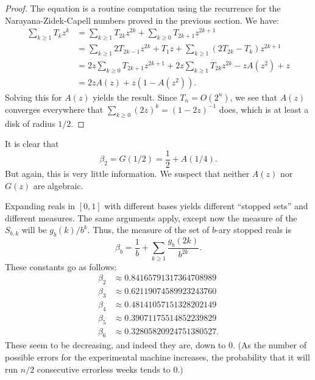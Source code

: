 \documentclass[12pt]{article}
\theoremstyle{definition}
\begin{document}
\begin{proof}
    The equation is a routine computation using the recurrence for the Narayana-Zidek-Capell numbers proved in
    the previous section. We have:
    \begin{align*}
        \sum_{k \geq 1} T_k z^k
            &= \sum_{k \geq 1} T_{2k} z^{2k} + \sum_{k \geq 0} T_{2k+1} z^{2k + 1} \\
            &= \sum_{k \geq 1} 2 T_{2k-1} z^{2k} + T_1 z + \sum_{k \geq 1} (2T_{2k} - T_k) z^{2k + 1} \\
            &= 2 z \sum_{k \geq 0} T_{2k+1} z^{2k + 1} + 2 z \sum_{k \geq 1} T_{2k} z^{2k} - z A(z^2) + z \\
            &= 2z A(z) + z(1 - A(z^2)).
    \end{align*}
    Solving this for $A(z)$ yields the result. Since $T_n =
    O(2^n)$, we see that $A(z)$ converges everywhere that $\sum_{k \geq 0} (2z)^k = (1 -
    2z)^{-1}$ does, which is at least a disk of radius $1/2$.
\end{proof}

It is clear that
\begin{equation*}
    \beta_2 = G(1/2) =\frac{1}{2} + A(1/4).
\end{equation*}
But again, this is very little information. We suspect that neither $A(z)$ nor
$G(z)$ are algebraic.

Expanding reals in $[0, 1]$ with different bases yields different ``stopped
sets'' and different measures. The same arguments apply, except now the measure
of the $S_{b,k}$ will be $g_b(k) / b^k$. Thus, the measure of the set of $b$-ary
stopped reals is
\begin{equation*}
    \beta_b = \frac{1}{b} + \sum_{k \geq 1} \frac{g_b(2k)}{b^{2k}}.
\end{equation*}
These constants go as follows:
\begin{align*}
    \beta_2 &\approx 0.84165791317364708989 \\
    \beta_3 &\approx 0.62119074589923243760 \\
    \beta_4 &\approx 0.48141057151328202149 \\
    \beta_5 &\approx 0.39071175514852239829 \\
    \beta_6 &\approx 0.32805820924751380527.
\end{align*}
These seem to be decreasing, and indeed they are, down to 0.
(As the number of possible errors for the experimental machine increases, the probability
that it will run $n/2$ consecutive errorless weeks tends to 0.)
\end{document}
